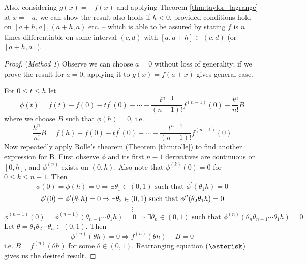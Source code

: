 \documentclass[10pt, a4paper, twoside]{report}
\begin{document}
Also, considering \(g(x)=-f(x)\) and applying Theorem \ref{thm:taylor_lagrange} at \(x=-a\), we can show the result also holds if \(h<0\), provided conditions hold on \([a+h,a],(a+h,a)\) etc. -- which is able to be assured by stating \(f\) is \(n\) times differentiable on some interval \((c,d)\) with \([a,a+h]\subset(c,d)\) (or \([a+h,a]\)).
\begin{proof}
    (\emph{Method 1}) Observe we can choose \(a=0\) without loss of generality; if we prove the result for \(a=0\), applying it to \(g(x)=f(a+x)\) gives general case.

    For \(0\leq t\leq h\) let 
    \[\phi(t)=f(t)-f(0)-tf^\prime(0)-\cdots-\frac{t^{n-1}}{(n-1)!}f^{(n-1)}(0)-\frac{t^n}{n!}B\]
    where we choose \(B\) such that \(\phi(h)=0\), i.e. 
    \[\frac{h^n}{n!}B=f(h)-f(0)-tf^\prime(0)-\cdots-\frac{t^{n-1}}{(n-1)!}f^{(n-1)}(0)\tag{\(\asterisk\)}\]
    Now repeatedly apply Rolle's theorem (Theorem \ref{thm:rolle}) to find another expression for B. First observe \(\phi\) and its first \(n-1\) derivatives are continuous on \([0,h]\), and \(\phi^{(n)}\) exists on \((0,h)\). Also note that \(\phi^{(k)}(0)=0\) for \(0\leq k\leq n-1\). Then
    \[\phi(0)=\phi(h)=0\Rightarrow\exists\theta_1\in(0,1)\text{  such that  }\phi^\prime(\theta_1h)=0\]
    \[\phi^\prime(0)=\phi^\prime(\theta_1h)=0\Rightarrow\exists\theta_2\in(0,1)\text{  such that  }\phi^{\prime\prime}(\theta_2\theta_1h)=0\]
    \[\vdots\]
    \[\phi^{(n-1)}(0)=\phi^{(n-1)}(\theta_{n-1}\cdots\theta_1h)=0\Rightarrow\exists\theta_n\in(0,1)\text{  such that  }\phi^{(n)}(\theta_n\theta_{n-1}\cdots\theta_1h)=0\]
    Let \(\theta=\theta_1\theta_2\cdots\theta_n\in(0,1)\). Then
    \[\phi^{(n)}(\theta h)=0\Rightarrow f^{(n)}(\theta h)-B=0\]
    i.e. \(B=f^{(n)}(\theta h)\) for some \(\theta\in(0,1)\). Rearranging equation (\(\asterisk\)) gives us the desired result.
\end{proof}
\end{document}
